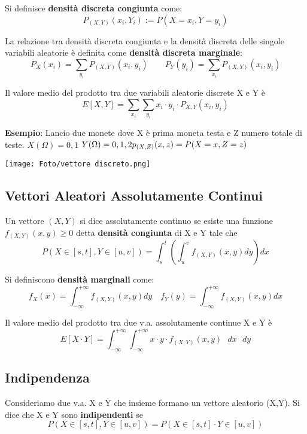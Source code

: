 \noindent Si definisce \textbf{densità discreta congiunta} come: $$P_{(X,Y)}(x_i, Y_i) := P(X= x_i, Y=y_i) $$

\noindent La relazione tra densità discreta congiunta e la densità discreta delle singole variabili aleatorie è definita come \textbf{densità discreta marginale}: $$P_X(x_i) = \sum_{y_i} P_{(X,Y)}(x_i,y_i) \qquad P_Y(y_i) = \sum_{x_i} P_{(X,Y)}(x_i,y_i)$$

\noindent Il valore medio del prodotto tra due variabili aleatorie discrete X e Y è $$E[X,Y] = \sum_{x_i} \sum_{y_i} x_i \cdot y_i \cdot P_{X,Y}(x_i, y_i)$$

\begin{tcolorbox}
    \textbf{Esempio}: Lancio due monete dove X è prima moneta testa e Z numero totale di teste. \newline $X(\Omega) = {0,1}$ \newline $Y(\Omega) = {0,1,2} \newline p_{(X,Z)}(x,z) = P(X = x, Z = z)$ \newline
    
    \texttt{[image: Foto/vettore discreto.png]}
\end{tcolorbox}

\subsection{Vettori Aleatori Assolutamente Continui}

Un vettore $(X,Y)$ si dice assolutamente continuo se esiste una funzione $f_{(X,Y)}(x,y) \geq 0$ detta \textbf{densità congiunta} di X e Y tale che $$P(X \in [s,t], Y \in [u,v]) = \int_s^t \left(\int_u^v f_{(X,Y)}(x,y) dy\right) dx$$

\noindent Si definiscono \textbf{densità marginali} come: $$f_X(x) = \int_{-\infty}^{+\infty} f_{(X,Y)}(x,y) dy \quad f_Y(y) = \int_{-\infty}^{+\infty} f_{(X,Y)}(x,y) dx$$

\noindent Il valore medio del prodotto tra due v.a. assolutamente continue X e Y è $$E[X \cdot Y] = \int_{-\infty}^{+\infty} \int_{-\infty}^{+\infty} x \cdot y \cdot f_{(X,Y)}(x,y) \text{ } dx  \text{ } dy$$

\subsection{Indipendenza}

Consideriamo due v.a. X e Y che insieme formano un vettore aleatorio (X,Y). Si dice che X e Y sono \textbf{indipendenti} se $$P(X \in [s,t], Y \in [u,v]) = P(X \in [s,t] \cdot Y \in [u,v])$$

